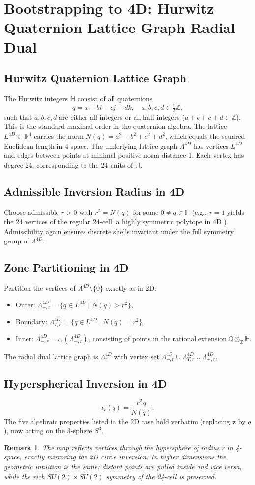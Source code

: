 \documentclass{article}
\newtheorem{remark}{Remark}
\begin{document}
\section{Bootstrapping to 4D: Hurwitz Quaternion Lattice Graph Radial Dual}
\subsection{Hurwitz Quaternion Lattice Graph}
The Hurwitz integers \(\mathbb{H}\) consist of all quaternions
\[
q = a + bi + cj + dk, \quad a,b,c,d \in \tfrac{1}{2}\mathbb{Z},
\]
such that \(a,b,c,d\) are either all integers or all half-integers (\(a+b+c+d \in \mathbb{Z}\)). This is the standard maximal order in the quaternion algebra.\cite{ConwaySmith2003} The lattice \(L^{4D} \subset \mathbb{R}^4\) carries the norm \(N(q) = a^2 + b^2 + c^2 + d^2\), which equals the squared Euclidean length in 4-space.
The underlying lattice graph \(\Lambda^{4D}\) has vertices \(L^{4D}\) and edges between points at minimal positive norm distance 1. Each vertex has degree 24, corresponding to the 24 units of \(\mathbb{H}\).
\subsection{Admissible Inversion Radius in 4D}
Choose admissible \(r > 0\) with \(r^2 = N(q)\) for some \(0 \neq q \in \mathbb{H}\) (e.g., \(r=1\) yields the 24 vertices of the regular 24-cell, a highly symmetric polytope in 4D \cite{Coxeter1973}). Admissibility again ensures discrete shells invariant under the full symmetry group of \(\Lambda^{4D}\).
\subsection{Zone Partitioning in 4D}
Partition the vertices of \(\Lambda^{4D} \setminus \{0\}\) exactly as in 2D:
\begin{itemize}
  \item Outer: \(\Lambda_{+,r}^{4D} = \{ q \in L^{4D} \mid N(q) > r^2 \}\),
  \item Boundary: \(\Lambda_{T,r}^{4D} = \{ q \in L^{4D} \mid N(q) = r^2 \}\),
  \item Inner: \(\Lambda_{-,r}^{4D} = \iota_r(\Lambda_{+,r}^{4D})\), consisting of points in the rational extension \(\mathbb{Q} \otimes_{\mathbb{Z}} \mathbb{H}\).
\end{itemize}
The radial dual lattice graph is \(\Lambda_r^{4D}\) with vertex set \(\Lambda_{-,r}^{4D} \cup \Lambda_{T,r}^{4D} \cup \Lambda_{+,r}^{4D}\).
\subsection{Hyperspherical Inversion in 4D}
\[
\iota_r(q) = \frac{r^2 \, q}{N(q)}.
\]
The five algebraic properties listed in the 2D case hold verbatim (replacing \(\mathbf{z}\) by \(q\)), now acting on the 3-sphere \(S^3\).
\begin{remark}
The map reflects vertices through the hypersphere of radius \(r\) in 4-space, exactly mirroring the 2D circle inversion. In higher dimensions the geometric intuition is the same: distant points are pulled inside and vice versa, while the rich \(SU(2) \times SU(2)\) symmetry of the 24-cell is preserved.
\end{remark}
\end{document}
